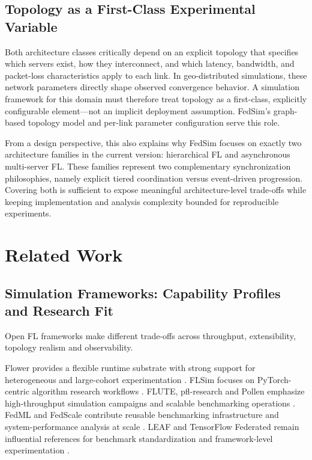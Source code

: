 \documentclass[conference]{IEEEtran}
\begin{document}
\subsection{Topology as a First-Class Experimental Variable}
Both architecture classes critically depend on an explicit topology that specifies which servers exist, how they interconnect, and which latency, bandwidth, and packet-loss characteristics apply to each link. In geo-distributed simulations, these network parameters directly shape observed convergence behavior. A simulation framework for this domain must therefore treat topology as a first-class, explicitly configurable element—not an implicit deployment assumption. FedSim's graph-based topology model and per-link parameter configuration serve this role.

From a design perspective, this also explains why FedSim focuses on exactly two architecture families in the current version: hierarchical FL and asynchronous multi-server FL. These families represent two complementary synchronization philosophies, namely explicit tiered coordination versus event-driven progression. Covering both is sufficient to expose meaningful architecture-level trade-offs while keeping implementation and analysis complexity bounded for reproducible experiments.

\section{Related Work}
\label{sec:related}
\subsection{Simulation Frameworks: Capability Profiles and Research Fit}
Open FL frameworks make different trade-offs across throughput, extensibility, topology realism and observability.

Flower provides a flexible runtime substrate with strong support for heterogeneous and large-cohort experimentation \cite{flower}. FLSim focuses on PyTorch-centric algorithm research workflows \cite{flsim}. FLUTE, pfl-research and Pollen emphasize high-throughput simulation campaigns and scalable benchmarking operations \cite{flute2022,granqvist2024,sani2023}. FedML and FedScale contribute reusable benchmarking infrastructure and system-performance analysis at scale \cite{he2020fedml,lai2022fedscale}. LEAF and TensorFlow Federated remain influential references for benchmark standardization and framework-level experimentation \cite{caldas2018leaf,tff}.
\end{document}
